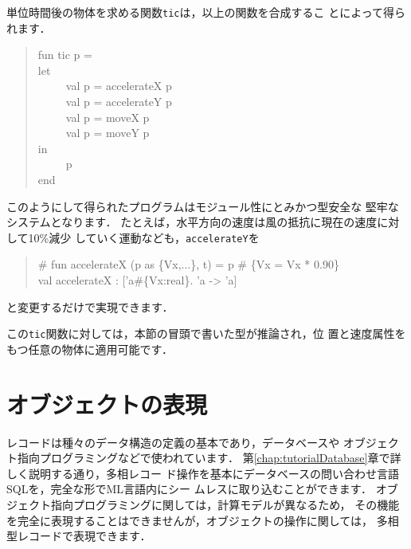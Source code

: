 \documentclass{jbook}
\newcommand{\myem}{\ \ \ \ \  }
\begin{document}
	単位時間後の物体を求める関数{\tt tic}は，以上の関数を合成するこ
とによって得られます．
\begin{tt}\begin{quote}
fun tic p =\\
let\\
\myem  val p = accelerateX p\\
\myem  val p = accelerateY p\\
\myem  val p = moveX p\\
\myem  val p = moveY p\\
in\\
\myem  p\\
end
\end{quote}\end{tt}
	このようにして得られたプログラムはモジュール性にとみかつ型安全な
堅牢なシステムとなります．
	たとえば，水平方向の速度は風の抵抗に現在の速度に対して10\%減少
していく運動なども，{\tt accelerateY}を
\begin{tt}\begin{quote}
\# fun accelerateX (p as \{Vx,...\}, t) = p \# \{Vx = Vx * 0.90\}\\
val accelerateX : ['a\#\{Vx:real\}. 'a -> 'a]\\
\end{quote}\end{tt}
と変更するだけで実現できます．

	この{\tt tic}関数に対しては，本節の冒頭で書いた型が推論され，位
置と速度属性をもつ任意の物体に適用可能です．


\section{オブジェクトの表現}
\label{sec:extensionObject}


	レコードは種々のデータ構造の定義の基本であり，データベースや
オブジェクト指向プログラミングなどで使われています．
	第\ref{chap:tutorialDatabase}章で詳しく説明する通り，多相レコー
ド操作を基本にデータベースの問い合わせ言語SQLを，完全な形でML言語内にシー
ムレスに取り込むことができます．
	オブジェクト指向プログラミングに関しては，計算モデルが異なるため，
その機能を完全に表現することはできませんが，オブジェクトの操作に関しては，
多相型レコードで表現できます．
	
\end{document}
